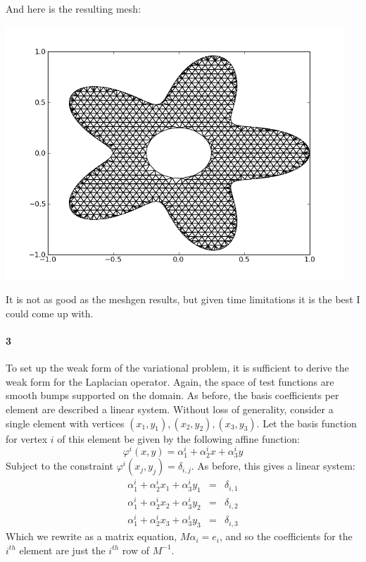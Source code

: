 \documentclass{article}
\begin{document}




And here is the resulting mesh:
\begin{center}
\includegraphics[width=5in]{prob2_result.png}
\end{center}

It is not as good as the meshgen results, but given time limitations it is the best I could come up with.

\paragraph{3}
To set up the weak form of the variational problem, it is sufficient to derive the weak form for the Laplacian operator.  Again, the space of test functions are smooth bumps supported on the domain.  As before, the basis coefficients per element are described a linear system.  Without loss of generality, consider a single element with vertices $(x_1, y_1), (x_2, y_2), (x_3, y_3)$.  Let the basis function for vertex $i$ of this element be given by the following affine function:
\[ \varphi^i(x, y) = \alpha^i_1 + \alpha^i_2 x + \alpha^i_3 y \]
Subject to the constraint $\varphi^i(x_j, y_j) = \delta_{i,j}$.  As before, this gives a linear system:
\begin{eqnarray*}
\alpha^i_1 + \alpha^i_2 x_1 + \alpha^i_3 y_1 & = & \delta_{i,1} \\
\alpha^i_1 + \alpha^i_2 x_2 + \alpha^i_3 y_2 & = & \delta_{i,2} \\
\alpha^i_1 + \alpha^i_2 x_3 + \alpha^i_3 y_3 & = & \delta_{i,3}
\end{eqnarray*}
Which we rewrite as a matrix equation, $M \alpha_i = e_i$, and so the coefficients for the $i^{th}$ element are just the $i^{th}$ row of $M^{-1}$.
\end{document}
